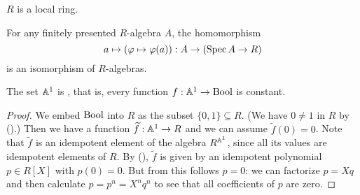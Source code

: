 \documentclass{zariski}
\begin{document}
\begin{axiom}[Loc]%
  \label{loc}
  $R$ is a local ring.
\end{axiom}

\begin{axiom}[SQC]%
  \label{sqc}
  For any finitely presented $R$-algebra $A$, the homomorphism
  \[ a \mapsto (\varphi\mapsto \varphi(a)) : A \to (\operatorname{Spec} A \to R)\]
  is an isomorphism of $R$-algebras.
\end{axiom}



\begin{proposition}%
  \label{proposition:A1-connected}
  The set $\mathbb{A}^1$ is , that is,
  every function $f : \mathbb{A}^1 \to \mathrm{Bool}$ is constant.
\end{proposition}

\begin{proof}
  We embed $\mathrm{Bool}$ into $R$ as the subset $\{0, 1\} \subseteq R$.
  (We have $0 \neq 1$ in $R$ by ().)
  Then we have a function $\widetilde{f} : \mathbb{A}^1 \to R$
  and we can assume $\widetilde{f}(0) = 0$.
  Note that $\widetilde{f}$ is an idempotent element of the algebra $R^{\mathbb{A}^1}$,
  since all its values are idempotent elements of $R$.
  By (),
  $\widetilde{f}$ is given by an idempotent polynomial $p \in R[X]$
  with $p(0) = 0$.
  But from this follows $p = 0$:
  we can factorize $p = X q$
  and then calculate $p = p^n = X^n q^n$
  to see that all coefficients of $p$ are zero.
\end{proof}
\end{document}
